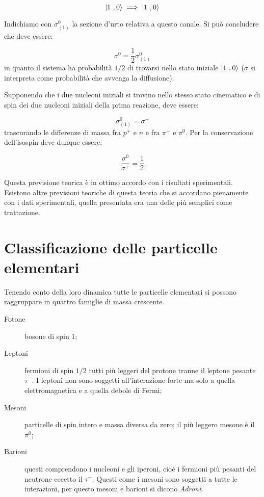 \begin{equation*}
\Ket{1 \ , 0} \implies \Ket{ 1 \ , 0}
\end{equation*}

Indichiamo con $\sigma^0_{(1)}$ la sezione d'urto relativa a questo canale. Si
può concludere che deve essere:

\begin{equation*}
\sigma^0 = \dfrac{1}{2} \sigma^0_{(1)}
\end{equation*}
in quanto il sistema ha probabilità $1/2$ di trovarsi nello stato iniziale
$\Ket{1 \ ,0}$ ($\sigma$ si interpreta come probabilità che avvenga la
diffusione).

Supponendo che i due nucleoni iniziali si trovino nello stesso stato cinematico
e di spin dei due nucleoni iniziali della prima reazione, deve essere:

\begin{equation*}
\sigma^0_{(1)} = \sigma^+
\end{equation*}
trascurando le differenze di massa fra $p^+$ e $n$ e fra $\pi^+$ e $\pi^0$. Per
la conservazione dell'isospin deve dunque essere:

\begin{equation*}
\dfrac{\sigma^0}{\sigma^+} = \dfrac{1}{2}
\end{equation*}

Questa previsione teorica è in ottimo accordo con i risultati sperimentali. 
Esistono altre previsioni teoriche di questa teoria che si accordano pienamente
con i dati sperimentali, quella presentata era una delle più semplici come
trattazione. 

\chapter{Classificazione delle particelle elementari}

Tenendo conto della loro dinamica tutte le particelle elementari si possono
raggruppare in quattro famiglie di massa crescente.

\begin{description}
 \item[Fotone] bosone di spin 1;
 \item[Leptoni] fermioni di spin $1/2$ tutti più leggeri del protone tranne il
   leptone pesante $\tau^-$. I leptoni non sono soggetti all'interazione forte
   ma solo a quella elettromagnetica e a quella debole di Fermi;
 \item[Mesoni] particelle di spin intero e massa diversa da zero; il più 
leggero
   mesone è il $\pi^0$;
 \item[Barioni] questi comprendono i nucleoni e gli iperoni, cioè i fermioni 
più
   pesanti del neutrone eccetto il $\tau^-$. Questi come i mesoni sono soggetti
   a tutte le interazioni, per questo mesoni e barioni si dicono
   \textit{Adroni}.
\end{description}

